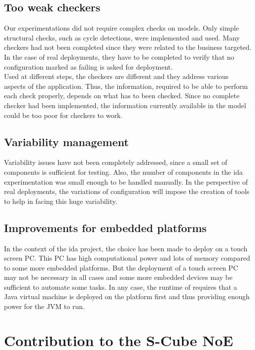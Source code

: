 \subsection{Too weak checkers}

Our experimentations did not require complex checks on models. Only simple structural checks, such as cycle detections, were implemented and used. Many checkers had not been completed since they were related to the business targeted. In the case of real deployments, they have to be completed to verify that no configuration marked as failing is asked for deployment.\\
Used at different steps, the checkers are different and they address various aspects of the application. Thus, the information, required to be able to perform each check properly, depends on what has to been checked. Since no  complete checker had been implemented, the information currently available in the model could be too poor for checkers to work.

\subsection{Variability management}

Variability issues have not been completely addressed, since a small set of components is sufficient for testing. Also, the number of components in the \gls{ida} experimentation was small enough to be handled manually. In the perspective of real deployments, the variations of configuration will impose the creation of tools to help in facing this huge variability.

\subsection{Improvements for embedded platforms}

In the context of the \gls{ida} project, the choice has been made to deploy \enti{} on a touch screen PC. This PC has high computational power and lots of memory compared to some more embedded platforms. But the deployment of a touch screen PC may not be necessary in all cases and some more embedded devices may be sufficient to automate some tasks. In any case, the runtime of \enti{} requires that a Java virtual machine is deployed on the platform first and thus providing enough power for the JVM to run.


\section{Contribution to the S-Cube NoE}

